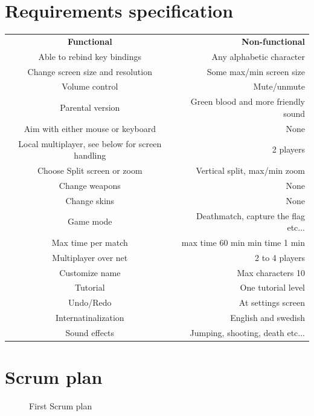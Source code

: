 \documentclass{article}
\begin{document}
\newpage
\section{Requirements specification}

\begin{tabular}{ | c | r |}
  \hline                       
   \textbf{Functional} & \textbf{Non-functional} \\
   Able to rebind key bindings & Any alphabetic character \\
   Change screen size and resolution & Some max/min screen size \\
   Volume control & Mute/unmute\\
   Parental version & Green blood and more friendly sound\\
   Aim with either mouse or keyboard & None \\
   Local multiplayer, see below for screen handling  & 2 players \\
   Choose Split screen or zoom & Vertical split, max/min zoom \\
   Change weapons & None \\
   Change skins & None \\
   Game mode & Deathmatch, capture the flag etc... \\
   Max time per match & max time 60 min min time 1 min\\
   Multiplayer over net & 2 to 4 players \\
   Customize name & Max characters 10 \\
   Tutorial & One tutorial level \\
   Undo/Redo & At settings screen \\
   Internatinalization & English and swedish \\
   Sound effects & Jumping, shooting, death etc...\\
  \hline  
\end{tabular}

\clearpage
\section{Scrum plan}
\begin{figure}[h!]
\centering
{}
\caption{First Scrum plan}
\label{fig:scrumplan}
\end{figure}
\end{document}
